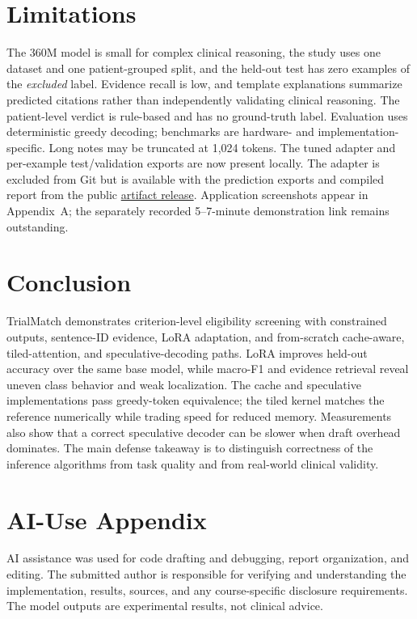 \documentclass[conference]{IEEEtran}
\begin{document}
\section{Limitations}
The 360M model is small for complex clinical reasoning, the study uses one dataset and
one patient-grouped split, and the held-out test has zero examples of the \emph{excluded}
label. Evidence recall is low, and template explanations summarize predicted citations
rather than independently validating clinical reasoning. The patient-level verdict is
rule-based and has no ground-truth label. Evaluation uses deterministic greedy decoding;
benchmarks are hardware- and implementation-specific. Long notes may be truncated at
1,024 tokens. The tuned adapter and per-example test/validation exports are now present
locally. The adapter is excluded from Git but is available with the prediction exports
and compiled report from the public
\href{https://github.com/abdullahamin231/trialmatch/releases/tag/assignment-2-artifacts-2026-11}{artifact release}.
Application screenshots appear in Appendix~A; the separately recorded
5--7-minute demonstration link remains outstanding.

\section{Conclusion}
TrialMatch demonstrates criterion-level eligibility screening with constrained outputs,
sentence-ID evidence, LoRA adaptation, and from-scratch cache-aware, tiled-attention,
and speculative-decoding paths. LoRA improves held-out accuracy over the same base
model, while macro-F1 and evidence retrieval reveal uneven class behavior and weak
localization. The cache and speculative implementations pass greedy-token equivalence;
the tiled kernel matches the reference numerically while trading speed for reduced
memory. Measurements also show that a correct speculative decoder can be slower when
draft overhead dominates. The main defense takeaway is to distinguish correctness of
the inference algorithms from task quality and from real-world clinical validity.

\section*{AI-Use Appendix}
AI assistance was used for code drafting and debugging, report organization, and
editing. The submitted author is responsible for verifying and understanding the
implementation, results, sources, and any course-specific disclosure requirements.
The model outputs are experimental results, not clinical advice.
\end{document}
